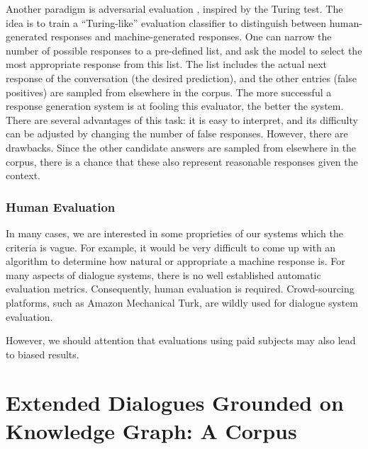 \documentclass[bsc,frontabs,twoside,singlespacing,parskip,deptreport]{infthesis}     %
\begin{document}
Another paradigm is adversarial evaluation \cite{bowman2015generating,kannan2017adversarial,li2017adversarial}, inspired by the Turing test. The idea is to train a “Turing-like” evaluation classifier to distinguish between human-generated responses and machine-generated responses. One can narrow the number of possible responses to a pre-defined list, and ask the model to select the most appropriate response from this list. The list includes the actual next response of the conversation (the desired prediction), and the other entries (false positives) are sampled from elsewhere in the corpus. The more successful a response generation system is at fooling this evaluator, the better the system. There are several advantages of this task: it is easy to interpret, and its difficulty can be adjusted by changing the number of false responses. However, there are drawbacks. Since the other candidate answers are sampled from elsewhere in the corpus, there is a chance that these also represent reasonable responses given the context. 

\subsection{Human Evaluation}

In many cases, we are interested in some proprieties of our systems which the criteria is vague. For example, it would be very difficult to come up with an algorithm to determine how natural or appropriate a machine response is. For many aspects of dialogue systems, there is no well established automatic evaluation metrics. Consequently, human evaluation is required. Crowd-sourcing platforms, such as Amazon Mechanical Turk\cite{mturk}, are wildly used for dialogue system evaluation. 


However, we should attention that evaluations using paid subjects may also lead to biased results\cite{young2013pomdp}.









\chapter{Extended Dialogues Grounded on Knowledge Graph: A Corpus}
\end{document}
